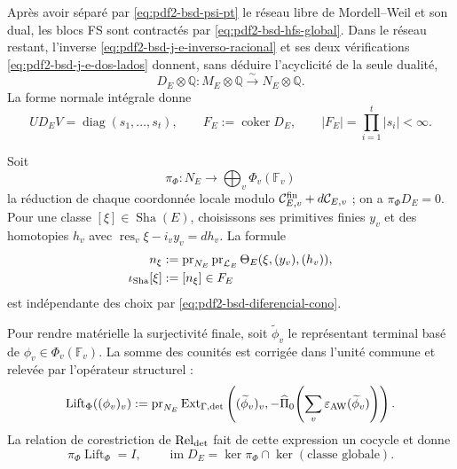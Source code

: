 Après avoir séparé par \eqref{eq:pdf2-bsd-psi-pt} le réseau libre de Mordell--Weil
et son dual, les blocs FS sont contractés par
\eqref{eq:pdf2-bsd-hfs-global}. Dans le réseau restant, l'inverse
\eqref{eq:pdf2-bsd-j-e-inverso-racional} et ses deux vérifications
\eqref{eq:pdf2-bsd-j-e-dos-lados} donnent, sans déduire l'acyclicité de la seule
dualité,
\begin{equation}\label{eq:pdf2-bsd-rango-completo}
 D_E\otimes\mathbb Q:M_E\otimes\mathbb Q
 \xrightarrow{\sim}N_E\otimes\mathbb Q.
\end{equation}
La forme normale intégrale donne
\begin{equation}\label{eq:pdf2-bsd-smith-finito}
 UD_EV=\operatorname{diag}(s_1,\ldots,s_t),
 \qquad
 F_E:=\operatorname{coker}D_E,
 \qquad |F_E|=\prod_{i=1}^t|s_i|<\infty.
\end{equation}

Soit
\begin{equation}\label{eq:pdf2-bsd-pi-componentes}
 \pi_\Phi:N_E\longrightarrow\bigoplus_v\Phi_v(\mathbb F_v)
\end{equation}
la réduction de chaque coordonnée locale modulo
$\mathcal C_{E,v}^{\rm fin}+d\mathcal C_{E,v}$ ; on a
$\pi_\Phi D_E=0$. Pour une classe
$[\xi]\in\operatorname{Sha}(E)$, choisissons ses primitives finies
$y_v$ et des homotopies $h_v$ avec
$\operatorname{res}_v\xi-i_vy_v=dh_v$. La formule
\begin{equation}\label{eq:pdf2-bsd-iota-sha-cociclos}
 \begin{aligned}
 n_\xi&:=\operatorname{pr}_{N_E}\operatorname{pr}_{\mathcal L_E}
       \Theta_E(\xi,(y_v),(h_v)),\\
 \iota_{\rm Sha}[\xi]&:=[n_\xi]\in F_E
 \end{aligned}
\end{equation}
est indépendante des choix par
\eqref{eq:pdf2-bsd-diferencial-cono}.

Pour rendre matérielle la surjectivité finale, soit
$\widetilde\phi_v$ le représentant terminal basé de
$\phi_v\in\Phi_v(\mathbb F_v)$. La somme des counités est corrigée dans
l'unité commune et relevée par l'opérateur structurel :
\begin{equation}\label{eq:pdf2-bsd-lift-componentes}
 \operatorname{Lift}_\Phi((\phi_v)_v):=
 \operatorname{pr}_{N_E}\operatorname{Ext}_{\Gamma,{\rm det}}
 \left((\widetilde\phi_v)_v,
 -\widehat\Pi_0\!\left(\sum_v
       \varepsilon_{\rm AW}(\widetilde\phi_v)\right)\right).
\end{equation}
La relation de corestriction de
$\operatorname{Rel}_{\rm det}$ fait de cette expression un cocycle et donne
\begin{equation}\label{eq:pdf2-bsd-lift-dos-identidades}
 \pi_\Phi\operatorname{Lift}_\Phi=I,
 \qquad
 \operatorname{im}D_E=
 \ker\pi_\Phi\cap\ker(\text{classe globale}).
\end{equation}

